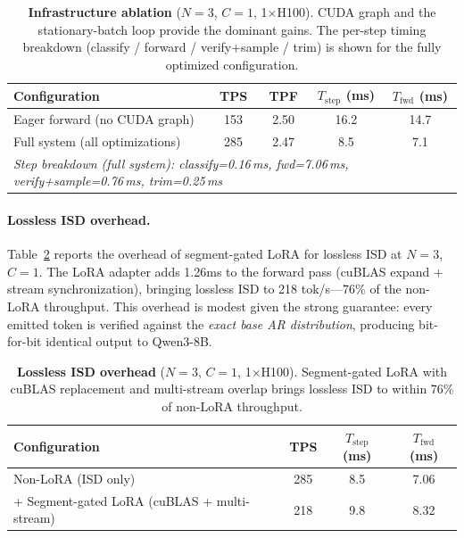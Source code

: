 \begin{table}[t]
\centering
\caption{\textbf{Infrastructure ablation} ($N{=}3$, $C{=}1$, 1$\times$H100). CUDA graph and the stationary-batch loop provide the dominant gains. The per-step timing breakdown (classify / forward / verify+sample / trim) is shown for the fully optimized configuration.}
\label{tab:ablation}
\small
\begin{tabular}{lcccc}
\toprule
\textbf{Configuration} & \textbf{TPS} & \textbf{TPF} & $T_{\text{step}}$ \textbf{(ms)} & $T_{\text{fwd}}$ \textbf{(ms)} \\
\midrule
Eager forward (no CUDA graph) & 153 & 2.50 & 16.2 & 14.7 \\
Full system (all optimizations) & 285 & 2.47 & 8.5 & 7.1 \\
\midrule
\multicolumn{5}{l}{\textit{Step breakdown (full system): classify=0.16\,ms, fwd=7.06\,ms, verify+sample=0.76\,ms, trim=0.25\,ms}} \\
\bottomrule
\end{tabular}
\end{table}

\paragraph{Lossless ISD overhead.}
Table~\ref{tab:lora_ablation} reports the overhead of segment-gated LoRA for lossless ISD at $N{=}3$, $C{=}1$. The LoRA adapter adds 1.26ms to the forward pass (cuBLAS expand + stream synchronization), bringing lossless ISD to 218 tok/s---76\% of the non-LoRA throughput. This overhead is modest given the strong guarantee: every emitted token is verified against the \emph{exact base AR distribution}, producing bit-for-bit identical output to Qwen3-8B.

\begin{table}[t]
\centering
\caption{\textbf{Lossless ISD overhead} ($N{=}3$, $C{=}1$, 1$\times$H100). Segment-gated LoRA with cuBLAS replacement and multi-stream overlap brings lossless ISD to within 76\% of non-LoRA throughput.}
\label{tab:lora_ablation}
\small
\begin{tabular}{lccc}
\toprule
\textbf{Configuration} & \textbf{TPS} & $T_{\text{step}}$ \textbf{(ms)} & $T_{\text{fwd}}$ \textbf{(ms)} \\
\midrule
Non-LoRA (ISD only) & 285 & 8.5 & 7.06 \\
+ Segment-gated LoRA (cuBLAS + multi-stream) & 218 & 9.8 & 8.32 \\
\bottomrule
\end{tabular}
\end{table}

